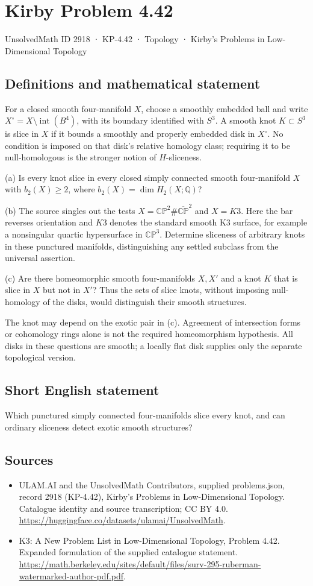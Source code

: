 \documentclass[11pt,a4paper]{article}
\begin{document}
\section*{Kirby Problem 4.42}\label{2918}
{\small UnsolvedMath ID 2918 · KP-4.42 · Topology · Kirby's Problems in Low-Dimensional Topology}
\subsection{Definitions and mathematical statement}
For a closed smooth four-manifold $X$, choose a smoothly embedded ball and write $X^\circ=X\setminus\operatorname{int}(B^4)$, with its boundary identified with $S^3$. A smooth knot $K\subset S^3$ is slice in $X$ if it bounds a smoothly and properly embedded disk in $X^\circ$. No condition is imposed on that disk's relative homology class; requiring it to be null-homologous is the stronger notion of $H$-sliceness.

(a) Is every knot slice in every closed simply connected smooth four-manifold $X$ with $b_2(X)\ge2$, where $b_2(X)=\dim H_2(X;\mathbb Q)$?

(b) The source singles out the tests $X=\mathbb{CP}^2\#\overline{\mathbb{CP}}^{2}$ and $X=K3$. Here the bar reverses orientation and $K3$ denotes the standard smooth K3 surface, for example a nonsingular quartic hypersurface in $\mathbb{CP}^3$. Determine sliceness of arbitrary knots in these punctured manifolds, distinguishing any settled subclass from the universal assertion.

(c) Are there homeomorphic smooth four-manifolds $X,X'$ and a knot $K$ that is slice in $X$ but not in $X'$? Thus the sets of slice knots, without imposing null-homology of the disks, would distinguish their smooth structures.

The knot may depend on the exotic pair in (c). Agreement of intersection forms or cohomology rings alone is not the required homeomorphism hypothesis. All disks in these questions are smooth; a locally flat disk supplies only the separate topological version.
\subsection{Short English statement}
Which punctured simply connected four-manifolds slice every knot, and can ordinary sliceness detect exotic smooth structures?
\subsection{Sources}
\begin{itemize}
\item[S1] ULAM.AI and the UnsolvedMath Contributors, supplied problems.json, record 2918 (KP-4.42), Kirby's Problems in Low-Dimensional Topology. Catalogue identity and source transcription; CC BY 4.0.
\url{https://huggingface.co/datasets/ulamai/UnsolvedMath}.
\item[S2] K3: A New Problem List in Low-Dimensional Topology, Problem 4.42. Expanded formulation of the supplied catalogue statement.
\url{https://math.berkeley.edu/sites/default/files/surv-295-ruberman-watermarked-author-pdf.pdf}.
\end{itemize}
\end{document}
